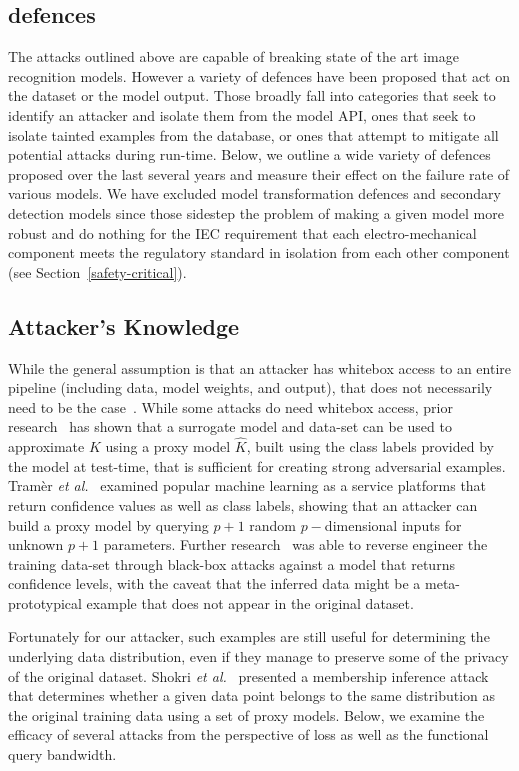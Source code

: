 \subsection{defences}
The attacks outlined above are capable of breaking state of the art image recognition models.
However a variety of defences have been proposed that act on the dataset or the model output.
Those broadly fall into categories that seek to identify an attacker and isolate them from the model API, ones that seek to isolate tainted examples from the database, or ones that attempt to mitigate all potential attacks during run-time.
Below, we outline a wide variety of defences proposed over the last several years and measure their effect on the failure rate of various models.
We have excluded model transformation defences and secondary detection models since those sidestep the problem of making a given model more robust and do nothing for the IEC requirement that each electro-mechanical component meets the regulatory standard in isolation from each other component (see Section~\ref{safety-critical}).

\subsection{Attacker's Knowledge}
 While the general assumption is that an attacker has whitebox access to an entire pipeline (including data, model weights, and output), that does not necessarily need to be the case~\cite{hopskipjump,chakraborty_adversarial_2018}.
While some attacks do need whitebox access, prior research~\cite{hopskipjump,nelson2010behavior} has shown that a surrogate model and data-set can be used to approximate $K$ using a proxy model $\widehat{K}$, built using the class labels provided by the model at test-time, that is sufficient for creating strong adversarial examples.
Tram\`er \textit{et al.}~\cite{tramer2016stealing} examined popular machine learning as a service platforms that return confidence values as well as class labels, showing that an attacker can build a proxy model by querying $ p + 1$ random $p-$dimensional inputs for unknown $p+1$ parameters.
Further research~\cite{fredrikson_model_2015} was able to reverse engineer the training data-set through black-box attacks against a model that returns confidence levels, with the caveat that the inferred data might be a meta-prototypical example that does not appear in the original dataset.

Fortunately for our attacker, such examples are still useful for determining the underlying data distribution, even if they manage to preserve some of the privacy of the original dataset.
Shokri \textit{et al.}~\cite{shokri2017membership} presented a membership inference attack that determines whether a given data point belongs to the same distribution as the original training data using a set of proxy models.
Below, we examine the efficacy of several attacks from the perspective of loss as well as the functional query bandwidth.




